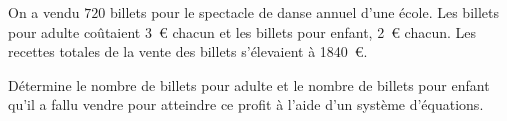 %
%
    On a vendu $720$ billets pour le spectacle de danse annuel d'une école. Les billets pour adulte coûtaient 3~€ chacun et les billets pour enfant, 2~€ chacun. Les recettes totales de la vente des billets s'élevaient à \num{1840}~€.

    Détermine le nombre de billets pour adulte et le nombre de billets pour enfant qu'il a fallu vendre pour atteindre ce profit à l'aide d'un système d'équations.
